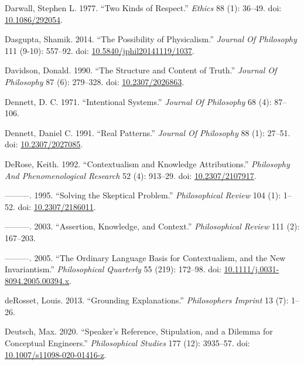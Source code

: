 \documentclass[
  10pt,
  letterpaper,
  DIV=11,
  numbers=noendperiod,
  twoside]{scrartcl}
\newlength{\cslhangindent}
\newenvironment{CSLReferences}[2] %
 {\begin{list}{}{%
  \setlength{\itemindent}{0pt}
  \setlength{\leftmargin}{0pt}
  \setlength{\parsep}{0pt}
  \ifodd #1
   \setlength{\leftmargin}{\cslhangindent}
   \setlength{\itemindent}{-1\cslhangindent}
  \fi
  \setlength{\itemsep}{#2\baselineskip}}}
 {\end{list}}
\begin{document}
\begin{CSLReferences}{1}{0}
Darwall, Stephen L. 1977. {``Two Kinds of Respect.''} \emph{Ethics} 88
(1): 36--49. doi: \href{https://doi.org/10.1086/292054}{10.1086/292054}.

Dasgupta, Shamik. 2014. {``The Possibility of Physicalism.''}
\emph{Journal Of Philosophy} 111 (9-10): 557--92. doi:
\href{https://doi.org/10.5840/jphil20141119/1037}{10.5840/jphil20141119/1037}.

Davidson, Donald. 1990. {``The Structure and Content of Truth.''}
\emph{Journal Of Philosophy} 87 (6): 279--328. doi:
\href{https://doi.org/10.2307/2026863}{10.2307/2026863}.

Dennett, D. C. 1971. {``Intentional Systems.''} \emph{Journal Of
Philosophy} 68 (4): 87--106.

Dennett, Daniel C. 1991. {``Real Patterns.''} \emph{Journal Of
Philosophy} 88 (1): 27--51. doi:
\href{https://doi.org/10.2307/2027085}{10.2307/2027085}.

DeRose, Keith. 1992. {``Contextualism and Knowledge Attributions.''}
\emph{Philosophy And Phenomenological Research} 52 (4): 913--29. doi:
\href{https://doi.org/10.2307/2107917}{10.2307/2107917}.

---------. 1995. {``Solving the Skeptical Problem.''}
\emph{Philosophical Review} 104 (1): 1--52. doi:
\href{https://doi.org/10.2307/2186011}{10.2307/2186011}.

---------. 2003. {``Assertion, Knowledge, and Context.''}
\emph{Philosophical Review} 111 (2): 167--203.

---------. 2005. {``The Ordinary Language Basis for Contextualism, and
the New Invariantism.''} \emph{Philosophical Quarterly} 55 (219):
172--98. doi:
\href{https://doi.org/10.1111/j.0031-8094.2005.00394.x}{10.1111/j.0031-8094.2005.00394.x}.

deRosset, Louis. 2013. {``Grounding Explanations.''} \emph{Philosophers
Imprint} 13 (7): 1--26.

Deutsch, Max. 2020. {``Speaker's Reference, Stipulation, and a Dilemma
for Conceptual Engineers.''} \emph{Philosophical Studies} 177 (12):
3935--57. doi:
\href{https://doi.org/10.1007/s11098-020-01416-z}{10.1007/s11098-020-01416-z}.


\end{CSLReferences}
\end{document}
